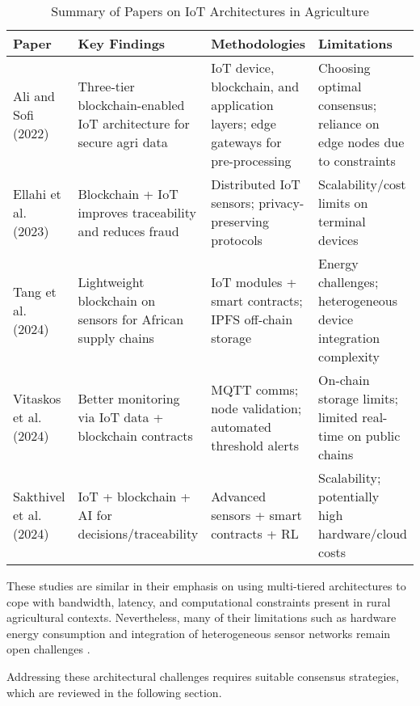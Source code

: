 \documentclass[12pt,onecolumn]{IEEEtran} %
\newcommand{\fitToPage}[1]{\begin{adjustbox}{max width=\textwidth}#1\end{adjustbox}}
\renewcommand{\arraystretch}{1.2}
\begin{document}
\begin{table}[htbp]
\caption{Summary of Papers on IoT Architectures in Agriculture}
\label{table2}
\centering
\fitToPage{
\begingroup
\setlength{\tabcolsep}{4pt}
\renewcommand{\arraystretch}{1.15}
\footnotesize
\begin{tabularx}{\textwidth}{@{}P{0.18\textwidth}YYY@{}}
\toprule
\textbf{Paper} & \textbf{Key Findings} & \textbf{Methodologies} & \textbf{Limitations} \\
\midrule
Ali and Sofi (2022) & Three-tier blockchain-enabled IoT architecture for secure agri data & IoT device, blockchain, and application layers; edge gateways for pre-processing & Choosing optimal consensus; reliance on edge nodes due to constraints \\
\addlinespace
Ellahi et al. (2023) & Blockchain + IoT improves traceability and reduces fraud & Distributed IoT sensors; privacy-preserving protocols & Scalability/cost limits on terminal devices \\
\addlinespace
Tang et al. (2024) & Lightweight blockchain on sensors for African supply chains & IoT modules + smart contracts; IPFS off-chain storage & Energy challenges; heterogeneous device integration complexity \\
\addlinespace
Vitaskos et al. (2024) & Better monitoring via IoT data + blockchain contracts & MQTT comms; node validation; automated threshold alerts & On-chain storage limits; limited real-time on public chains \\
\addlinespace
Sakthivel et al. (2024) & IoT + blockchain + AI for decisions/traceability & Advanced sensors + smart contracts + RL & Scalability; potentially high hardware/cloud costs \\
\bottomrule
\end{tabularx}
\endgroup
}
\end{table}



These studies are similar in their emphasis on using multi-tiered architectures to cope with bandwidth, latency, and computational constraints present in rural agricultural contexts. Nevertheless, many of their limitations such as hardware energy consumption and integration of heterogeneous sensor networks remain open challenges \cite{morais2023surveyonintegration, tang2024assessingblockchainand}.

Addressing these architectural challenges requires suitable consensus strategies, which are reviewed in the following section.
\end{document}
